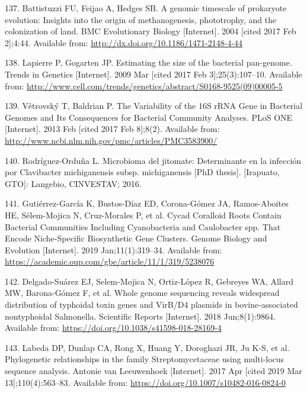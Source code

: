 \documentclass[12pt,twoside]{reedthesis}
\begin{document}
  \hypertarget{ref-battistuzzi_genomic_2004}{}
  137. Battistuzzi FU, Feijao A, Hedges SB. A genomic timescale of
  prokaryote evolution: Insights into the origin of methanogenesis,
  phototrophy, and the colonization of land. BMC Evolutionary Biology
  {[}Internet{]}. 2004 {[}cited 2017 Feb 2{]};4:44. Available from:
  \url{http://dx.doi.org/10.1186/1471-2148-4-44}
  
  \hypertarget{ref-lapierre_estimating_2009}{}
  138. Lapierre P, Gogarten JP. Estimating the size of the bacterial
  pan-genome. Trends in Genetics {[}Internet{]}. 2009 Mar {[}cited 2017
  Feb 3{]};25(3):107--10. Available from:
  \url{http://www.cell.com/trends/genetics/abstract/S0168-9525(09)00005-5}
  
  \hypertarget{ref-vetrovsky_variability_2013}{}
  139. Větrovský T, Baldrian P. The Variability of the 16S rRNA Gene in
  Bacterial Genomes and Its Consequences for Bacterial Community Analyses.
  PLoS ONE {[}Internet{]}. 2013 Feb {[}cited 2017 Feb 8{]};8(2). Available
  from: \url{http://www.ncbi.nlm.nih.gov/pmc/articles/PMC3583900/}
  
  \hypertarget{ref-rodriguez_tesis_2016}{}
  140. Rodríguez-Orduña L. Microbioma del jitomate: Determinante en la
  infección por Clavibacter michiganensis subsp. michiganensis
  {[}PhD thesis{]}. {[}Irapuato, GTO{]}: Langebio, CINVESTAV; 2016.
  
  \hypertarget{ref-gutierrez-garcia_cycad_2019}{}
  141. Gutiérrez-García K, Bustos-Díaz ED, Corona-Gómez JA, Ramos-Aboites
  HE, Sélem-Mojica N, Cruz-Morales P, et al. Cycad Coralloid Roots Contain
  Bacterial Communities Including Cyanobacteria and Caulobacter spp. That
  Encode Niche-Specific Biosynthetic Gene Clusters. Genome Biology and
  Evolution {[}Internet{]}. 2019 Jan;11(1):319--34. Available from:
  \url{https://academic.oup.com/gbe/article/11/1/319/5238076}
  
  \hypertarget{ref-delgado-suarez_whole_2018}{}
  142. Delgado-Suárez EJ, Selem-Mojica N, Ortiz-López R, Gebreyes WA,
  Allard MW, Barona-Gómez F, et al. Whole genome sequencing reveals
  widespread distribution of typhoidal toxin genes and VirB/D4 plasmids in
  bovine-associated nontyphoidal Salmonella. Scientific Reports
  {[}Internet{]}. 2018 Jun;8(1):9864. Available from:
  \url{https://doi.org/10.1038/s41598-018-28169-4}
  
  \hypertarget{ref-labeda_phylogenetic_2017}{}
  143. Labeda DP, Dunlap CA, Rong X, Huang Y, Doroghazi JR, Ju K-S, et al.
  Phylogenetic relationships in the family Streptomycetaceae using
  multi-locus sequence analysis. Antonie van Leeuwenhoek {[}Internet{]}.
  2017 Apr {[}cited 2019 Mar 13{]};110(4):563--83. Available from:
  \url{https://doi.org/10.1007/s10482-016-0824-0}
  
\end{document}
